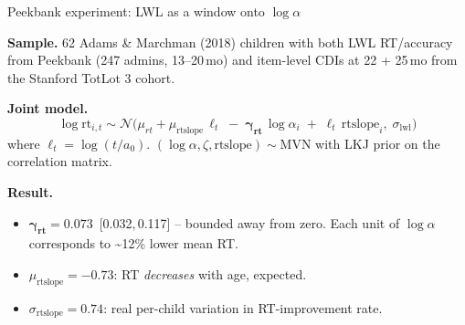 \documentclass[aspectratio=169,t]{beamer}
\begin{document}
\begin{frame}{Peekbank experiment: LWL as a window onto $\log\alpha$}

\textbf{Sample.} 62 Adams \& Marchman (2018) children with both LWL
RT/accuracy from Peekbank (247 admins, 13--20\,mo) and item-level
CDIs at 22 + 25\,mo from the Stanford TotLot 3 cohort.

\vspace{0.6em}
\textbf{Joint model.}
\[
\log \mathrm{rt}_{i,t} \sim \mathcal{N}\!\big(
\mu_{rt} + \mu_{\mathrm{rtslope}}\,\ell_t
\;-\; \boldsymbol{\gamma_{rt}}\,\log \alpha_i
\;+\; \ell_t\,\mathrm{rtslope}_i,
\;\sigma_{\mathrm{lwl}}\big)
\]
where $\ell_t = \log(t/a_0)$.
$(\log \alpha, \zeta, \mathrm{rtslope}) \sim \mathrm{MVN}$
with LKJ prior on the correlation matrix.

\vspace{0.6em}
\textbf{Result.}
\begin{itemize}\setlength\itemsep{0.2em}
\item $\boldsymbol{\gamma_{rt} = 0.073}$ \,[0.032,\,0.117]
  -- bounded away from zero. Each unit of $\log \alpha$ corresponds
  to \textasciitilde{}12\% lower mean RT.
\item $\mu_{\mathrm{rtslope}} = -0.73$: RT \emph{decreases} with age,
  expected.
\item $\sigma_{\mathrm{rtslope}} = 0.74$: real per-child variation in
  RT-improvement rate.
\end{itemize}

\end{frame}
\end{document}
